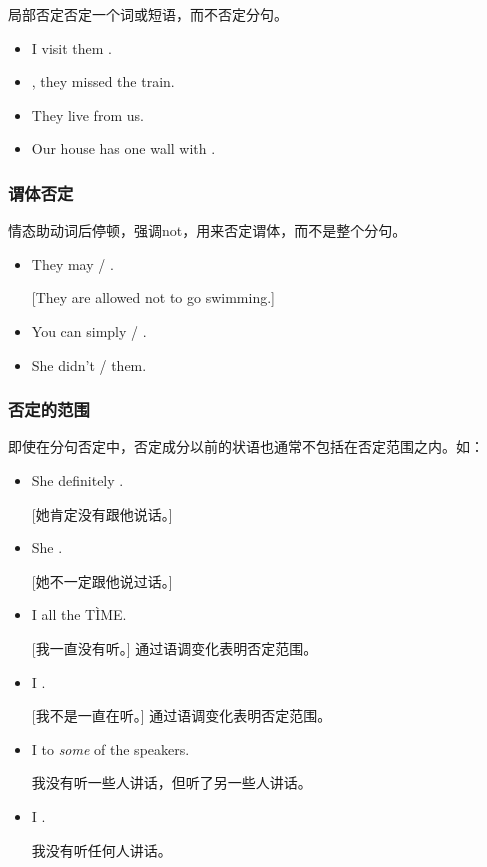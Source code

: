 局部否定否定一个词或短语，而不否定分句。
\begin{itemize}
\item I visit them .

\item {}, they missed the train.

\item They live  from us.

\item Our house has one wall with .
\end{itemize}

\subsubsection{谓体否定}

情态助动词后停顿，强调not，用来否定谓体，而不是整个分句。

\begin{itemize}
\item They may / .

  [They are allowed not to go swimming.]

\item You can simply / .

\item She didn't /  them.
\end{itemize}

\subsubsection{否定的范围}

即使在分句否定中，否定成分以前的状语也通常不包括在否定范围之内。如：
\begin{itemize}
\item She definitely .

  [她肯定没有跟他说话。]
\item She .

  [她不一定跟他说过话。]

\item I  all the T\`IME.

  [我一直没有听。] 通过语调变化表明否定范围。

\item I .

  [我不是一直在听。] 通过语调变化表明否定范围。

\item I  to \emph{some} of the speakers.

  我没有听一些人讲话，但听了另一些人讲话。
\item I .

  我没有听任何人讲话。

\end{itemize}

